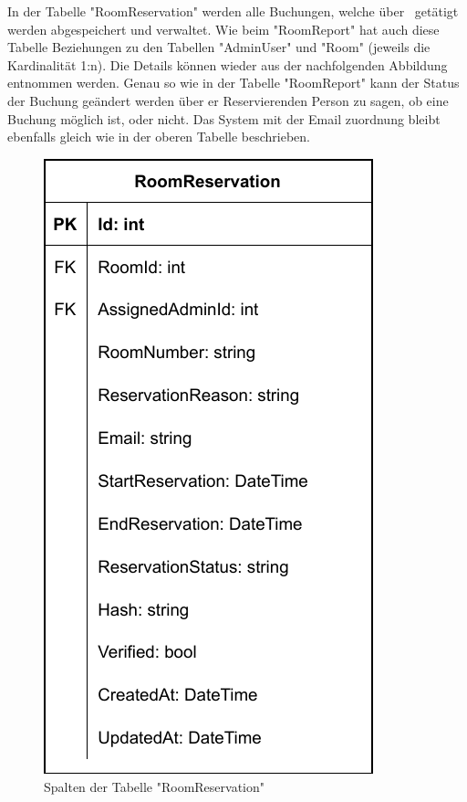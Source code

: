 
In der Tabelle "RoomReservation" werden alle Buchungen, welche über \ZELIA\ getätigt werden abgespeichert und verwaltet. Wie beim "RoomReport" hat auch diese Tabelle Beziehungen zu den Tabellen "AdminUser" und "Room" (jeweils die Kardinalität 1:n). Die Details können wieder aus der nachfolgenden Abbildung entnommen werden. Genau so wie in der Tabelle "RoomReport" kann der Status der Buchung geändert werden über er Reservierenden Person zu sagen, ob eine Buchung möglich ist, oder nicht. Das System mit der Email zuordnung bleibt ebenfalls gleich wie in der oberen Tabelle beschrieben.

\begin{figure}[H]
    \centering
    \includegraphics{media/MariaDB/RoomReservation.svg.pdf}
    \caption{Spalten der Tabelle "RoomReservation"}
\end{figure}


